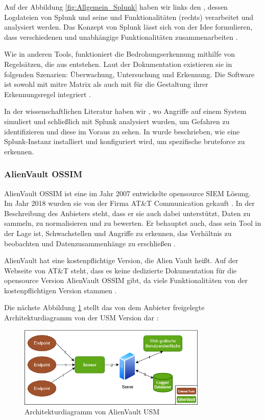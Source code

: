 Auf der Abbildung \ref{fig:Allgemein_Splunk} haben wir links den , dessen Logdateien von Splunk und seine  und Funktionalitäten (rechts) verarbeitet und analysiert werden. Das Konzept von Splunk lässt sich von der Idee formulieren, dass verschiedenen und unabhängige Funktionalitäten zusammenarbeiten \citep{Splunk_platform}.

Wie in anderen Tools, funktioniert die Bedrohungserkennung mithilfe von Regelsätzen, die aus  entstehen. Laut der Dokumentation existieren sie in folgenden Szenarien: Überwachung, Untersuchung und Erkennung. Die Software ist sowohl mit \gls{mitre} Matrix als auch mit  für die Gestaltung ihrer Erkennungsregel integriert \citep{Splunk_usecases}.

In der wissenschaftlichen Literatur haben wir \cite{Su_SplunkDDOS}, wo Angriffe auf einem System simuliert und schließlich mit Splunk analysiert wurden, um Gefahren zu identifizieren und diese im Voraus zu sehen. In \cite{Selvaganesh_SplunkBruteForce} wurde beschrieben, wie eine Splunk-Instanz installiert und konfiguriert wird, um spezifische \gls{bruteforce} zu erkennen.

\subsubsection{AlienVault OSSIM}
AlienVault OSSIM ist eine im Jahr 2007 entwickelte \gls{opensource} \gls{SIEM} Lösung. Im Jahr 2018 wurden sie von der Firma AT\&T Communication gekauft  \citep{CBN_AV}. In der Beschreibung des Anbieters steht, dass er sie auch dabei unterstützt, Daten zu sammeln, zu normalisieren und zu bewerten. Er behauptet auch, dass sein Tool in der Lage ist, Schwachstellen und Angriffe zu erkennen, das Verhältnis zu beobachten und Datenzusammenhänge zu erschließen \citep{ATT_AVO}.

AlienVault hat eine kostenpflichtige Version, die Alien Vault  heißt. Auf der Webseite von AT\&T steht, dass es keine dedizierte Dokumentation für die \gls{opensource} Version AlienVault OSSIM gibt, da viele Funktionalitäten von der kostenpflichtigen Version stammen \citep{ATT_AVO}.

Die nächste Abbildung \ref{fig:AlienVault_Architektur} stellt das von dem Anbieter freigelegte Architekturdiagramm von der \gls{USM} Version dar \citep{ATT_AVO}:

\begin{figure}[H]
   \centering
   \includegraphics[width=0.8\textwidth]{assets/AlienVault.drawio.png}
   \caption[Architekturdiagramm von AlienVault \gls{USM}]
   {Architekturdiagramm von AlienVault \gls{USM}}
   \label{fig:AlienVault_Architektur}
   \centering
\end{figure}


